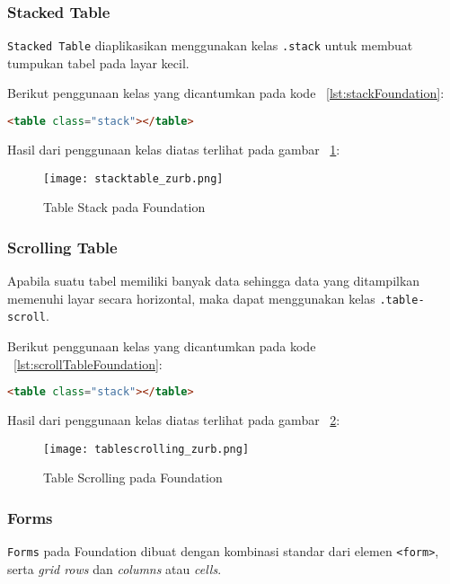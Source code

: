 \subsubsection{Stacked Table}
\texttt{Stacked Table} diaplikasikan menggunakan kelas \texttt{.stack} untuk membuat tumpukan tabel pada layar kecil.


\noindent Berikut penggunaan kelas yang dicantumkan pada kode ~\ref{lst:stackFoundation}:
\begin{lstlisting}[style=customhtml, language=HTML,  basicstyle=\ttfamily, frame=single, columns=fullflexible, keepspaces=true, breaklines=true, showstringspaces=false, label={lst:stackFoundation}, caption=Tabel stack pada foundation 6.] 
<table class="stack"></table>
\end{lstlisting}
\noindent Hasil dari penggunaan kelas diatas terlihat pada gambar ~\ref{fig:stackTableFoundation}:
\begin{figure} [H]
	\centering  
	\texttt{[image: stacktable\_zurb.png]}  
	\caption{Table Stack pada Foundation}
	\label{fig:stackTableFoundation}
\end{figure}

\subsubsection{Scrolling Table}
Apabila suatu tabel memiliki banyak data sehingga data yang ditampilkan memenuhi layar secara horizontal, maka dapat menggunakan kelas \texttt{.table-scroll}.

\noindent Berikut penggunaan kelas yang dicantumkan pada kode ~\ref{lst:scrollTableFoundation}:
\begin{lstlisting}[style=customhtml, language=HTML,  basicstyle=\ttfamily, frame=single, columns=fullflexible, keepspaces=true, breaklines=true, showstringspaces=false, label={lst:scrollTableFoundation}, caption=Scroll tabel pada foundation 6.] 
<table class="stack"></table>
\end{lstlisting}
\noindent Hasil dari penggunaan kelas diatas terlihat pada gambar ~\ref{fig:scrollTableFoundation}:
\begin{figure} [H]
	\centering  
	\texttt{[image: tablescrolling\_zurb.png]}  
	\caption{Table Scrolling pada Foundation}
	\label{fig:scrollTableFoundation}
\end{figure}


\subsubsection{Forms}
\texttt{Forms} pada Foundation dibuat dengan kombinasi standar dari elemen \texttt{<form>}, serta \textit{grid rows} dan \textit{columns} atau \textit{cells}. 

